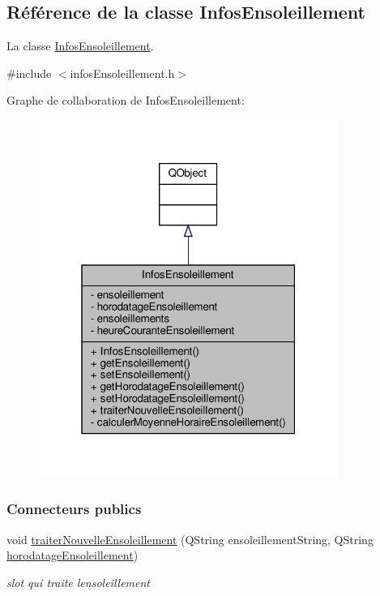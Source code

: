 \hypertarget{class_infos_ensoleillement}{}\subsection{Référence de la classe Infos\+Ensoleillement}
\label{class_infos_ensoleillement}


La classe \hyperlink{class_infos_ensoleillement}{Infos\+Ensoleillement}.  




{\ttfamily \#include $<$infos\+Ensoleillement.\+h$>$}



Graphe de collaboration de Infos\+Ensoleillement\+:\nopagebreak
\begin{figure}[H]
\begin{center}
\leavevmode
\includegraphics[width=277pt]{class_infos_ensoleillement__coll__graph}
\end{center}
\end{figure}
\subsubsection*{Connecteurs publics}
\begin{DoxyCompactItemize}
\item 
void \hyperlink{class_infos_ensoleillement_abe5426845614e3383e915dc9b3cacc3e}{traiter\+Nouvelle\+Ensoleillement} (Q\+String ensoleillement\+String, Q\+String \hyperlink{class_infos_ensoleillement_aa2014f9d13e69e9807543737240dbfd3}{horodatage\+Ensoleillement})
\begin{DoxyCompactList}\small\item\em slot qui traite l\textquotesingle{}ensoleillement \end{DoxyCompactList}\end{DoxyCompactItemize}
